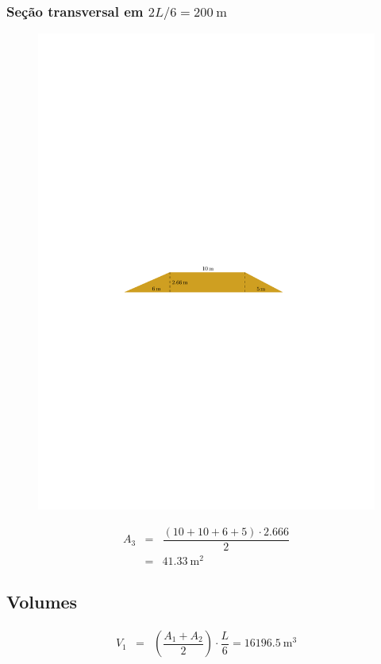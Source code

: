 \documentclass[a4paper, 12pt, brazilian]{article}
\begin{document}
	\subsubsection{Seção transversal em $2L/6=\SI{200}{\meter}$}
	\begin{figure}[H]
		\centering
		\includegraphics[width=0.85\linewidth]{images/twolpersix}
		\label{fig:twolpersix}
	\end{figure}
	
	\begin{eqnarray}
		A_{3}&=&\dfrac{(10+10+6+5)\cdot 2.666}{2}\\
		&=&\SI{41.33}{\meter^{2}}
	\end{eqnarray}
	
	\subsection{Volumes}
	\begin{eqnarray}
		V_{1}&=&\left(\dfrac{A_{1}+A_{2}}{2}\right)\cdot\dfrac{L}{6}=\SI{16196.5}{\meter^{3}}
	\end{eqnarray}
	
\end{document}
